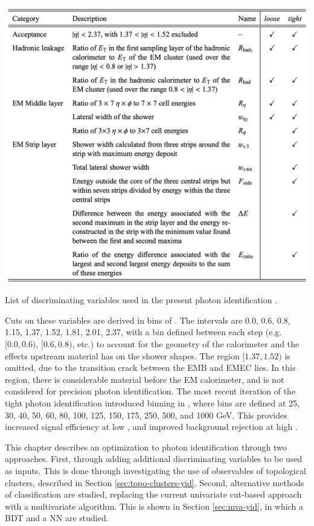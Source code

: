 \begin{table}
    \centering
    \includegraphics[width=.90\textwidth]{chapters/chapter4_photonID/images/ss-table.png}
    \caption[List of discriminating variables used in the present photon identification.]
    {List of discriminating variables used in the present photon identification \cite{r1-photonID}.}
    \label{tab:ss-vars-table}
\end{table}


Cuts on these variables are derived in bins of \abseta. The intervals are 0.0, 0.6, 0.8, 1.15, 1.37, 1.52, 1.81, 2.01, 2.37, with a bin defined between each step (e.g. $[0.0,0.6)$, $[0.6,0.8)$, etc.) to account for the geometry of the calorimeter and the effects upstream material has on the shower shapes. The region $[1.37,1.52)$ is omitted, due to the transition crack between the \gls{EMB} and \gls{EMEC} lies. In this region, there is considerable material before the \gls{EM} calorimeter, and is not considered for precision photon identification. The most recent iteration of the tight photon identification introduced binning in \pt, where bins are defined at 25, 30, 40, 50, 60, 80, 100, 125, 150, 175, 250, 500, and 1000 GeV. This provides increased signal efficiency at low \pt, and improved background rejection at high \pt.

This chapter describes an optimization to photon identification through two approaches. First, through adding additional discriminating variables to be used as inputs. This is done through investigating the use of observables of topological clusters, described in Section \ref{sec:topo-clusters-yid}. Second, alternative methods of classification are studied, replacing the current univariate cut-based approach with a multivariate algorithm. This is shown in Section \ref{sec:mva-yid}, in which a \gls{BDT} and a \gls{NN} are studied.


